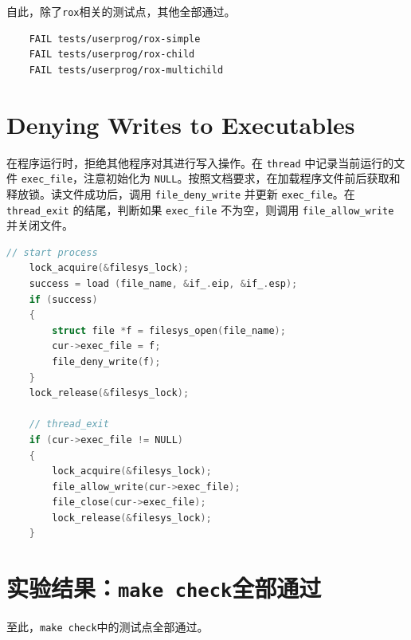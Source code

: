 \documentclass{article}
\begin{document}
自此，除了\texttt{rox}相关的测试点，其他全部通过。

\begin{lstlisting}
	FAIL tests/userprog/rox-simple
	FAIL tests/userprog/rox-child
	FAIL tests/userprog/rox-multichild
\end{lstlisting}

\section{Denying Writes to Executables}

在程序运行时，拒绝其他程序对其进行写入操作。在 \texttt{thread} 中记录当前运行的文件 \texttt{exec\_file}，注意初始化为 \texttt{NULL}。按照文档要求，在加载程序文件前后获取和释放锁。读文件成功后，调用 \texttt{file\_deny\_write} 并更新 \texttt{exec\_file}。在 \texttt{thread\_exit} 的结尾，判断如果 \texttt{exec\_file} 不为空，则调用 \texttt{file\_allow\_write} 并关闭文件。

\begin{lstlisting}[language=C]
	// start process
	lock_acquire(&filesys_lock);
	success = load (file_name, &if_.eip, &if_.esp);
	if (success)
	{
		struct file *f = filesys_open(file_name);
		cur->exec_file = f;
		file_deny_write(f);
	}
	lock_release(&filesys_lock);
	
	// thread_exit
	if (cur->exec_file != NULL)
	{
		lock_acquire(&filesys_lock);
		file_allow_write(cur->exec_file);
		file_close(cur->exec_file);
		lock_release(&filesys_lock);
	}
\end{lstlisting}

\section{实验结果：\texttt{make check}全部通过}

至此，\texttt{make check}中的测试点全部通过。
\end{document}
